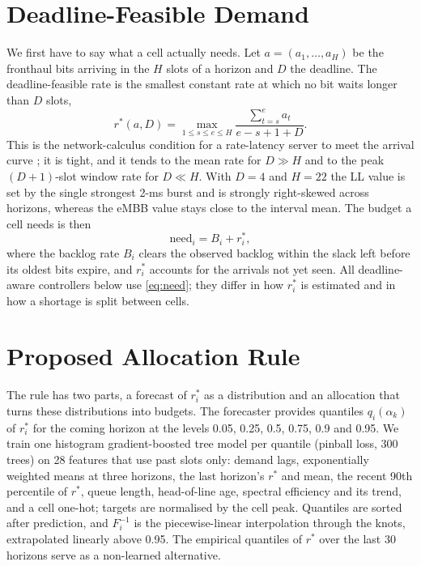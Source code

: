 \documentclass[conference]{IEEEtran}
\begin{document}
\section{Deadline-Feasible Demand}
\label{sec:demand}
We first have to say what a cell actually needs. Let $a = (a_1,\dots,a_H)$ be the fronthaul bits arriving in the $H$ slots of a horizon and $D$ the deadline. The deadline-feasible rate is the smallest constant rate at which no bit waits longer than $D$ slots,
\begin{equation}
r^\ast(a, D) = \max_{1 \le s \le e \le H} \frac{\sum_{t=s}^{e} a_t}{e - s + 1 + D} .
\label{eq:rstar}
\end{equation}
This is the network-calculus condition for a rate-latency server to meet the arrival curve \cite{leboudec2001}; it is tight, and it tends to the mean rate for $D \gg H$ and to the peak $(D{+}1)$-slot window rate for $D \ll H$. With $D = 4$ and $H = 22$ the LL value is set by the single strongest 2-ms burst and is strongly right-skewed across horizons, whereas the eMBB value stays close to the interval mean. The budget a cell needs is then
\begin{equation}
\text{need}_i = B_i + r^\ast_i ,
\label{eq:need}
\end{equation}
where the backlog rate $B_i$ clears the observed backlog within the slack left before its oldest bits expire, and $r^\ast_i$ accounts for the arrivals not yet seen. All deadline-aware controllers below use \eqref{eq:need}; they differ in how $r^\ast_i$ is estimated and in how a shortage is split between cells.

\section{Proposed Allocation Rule}
\label{sec:method}
The rule has two parts, a forecast of $r^\ast_i$ as a distribution and an allocation that turns these distributions into budgets. The forecaster provides quantiles $q_i(\alpha_k)$ of $r^\ast_i$ for the coming horizon at the levels 0.05, 0.25, 0.5, 0.75, 0.9 and 0.95. We train one histogram gradient-boosted tree model per quantile (pinball loss, 300 trees) on 28 features that use past slots only: demand lags, exponentially weighted means at three horizons, the last horizon's $r^\ast$ and mean, the recent 90th percentile of $r^\ast$, queue length, head-of-line age, spectral efficiency and its trend, and a cell one-hot; targets are normalised by the cell peak. Quantiles are sorted after prediction, and $F_i^{-1}$ is the piecewise-linear interpolation through the knots, extrapolated linearly above 0.95. The empirical quantiles of $r^\ast$ over the last 30 horizons serve as a non-learned alternative.
\end{document}
